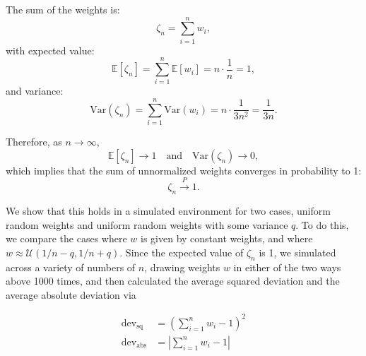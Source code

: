 The sum of the weights is:
\begin{equation}
\zeta_n = \sum_{i=1}^{n} w_i,
\end{equation}
with expected value:
\begin{equation}
\mathbb{E}[\zeta_n] = \sum_{i=1}^{n} \mathbb{E}[w_i] = n \cdot \frac{1}{n} = 1,
\end{equation}
and variance:
\begin{equation}
\text{Var}(\zeta_n) = \sum_{i=1}^{n} \text{Var}(w_i) = n \cdot \frac{1}{3n^2} = \frac{1}{3n}.
\end{equation}

Therefore, as \( n \to \infty \),
\begin{equation}
\mathbb{E}[\zeta_n] \to 1 \quad \text{and} \quad \text{Var}(\zeta_n) \to 0,
\end{equation}
which implies that the sum of unnormalized weights converges in probability to 1:
\begin{equation}
\zeta_n \xrightarrow{P} 1.
\end{equation}

We show that this holds in a simulated environment for two cases, uniform random weights and uniform random weights with some variance $q$. To do this, we compare the cases where $w$ is given by constant weights, and where $w \approx  \mathcal{U}(1/n-q,1/n+q)$. Since the expected value of $\zeta_n$ is 1, we simulated across a variety of numbers of $n$, drawing weights $w$ in either of the two ways above 1000 times, and then calculated the average squared deviation and the average absolute deviation via 

\begin{equation}
    \begin{aligned}
    \text{dev}_{\text{sq}} &= \left( \sum_{i=1}^n w_i - 1\right) ^ 2 \\ 
    \text{dev}_{\text{abs}} &= \left| \sum_{i=1}^n w_i - 1\right|
    \end{aligned}
\end{equation}


